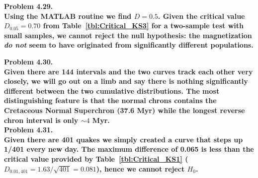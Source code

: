 \noindent
\bf{Problem 4.29.} \\

Using the MATLAB routine we find $D = 0.5$.  Given the critical value $D_{0.05} = 0.70$ from Table~\ref{tbl:Critical_KS3} for
a two-sample test with small samples,
we cannot reject the null hypothesis: the magnetization \emph{do not} seem to have originated from significantly
different populations.

\noindent
\bf{Problem 4.30.} \\

Given there are 144 intervals and the two curves track each other very closely, we will go out on a limb and say there
is nothing significantly different between the two cumulative distributions.  The most distinguishing feature is that the
normal chrons contains the Cretaceous Normal Superchron (37.6 Myr) while the longest reverse chron interval is only $\sim4$ Myr.
\\

\noindent
\bf{Problem 4.31.} \\

Given there are 401 quakes we simply created a curve that steps up 1/401 every new day.  The maximum difference of 0.065 is less than
the critical value provided by Table~\ref{tbl:Critical_KS1} ($D_{0.01,401} = 1.63/\sqrt{401} = 0.081$), hence we cannot reject $H_0$.
\\

